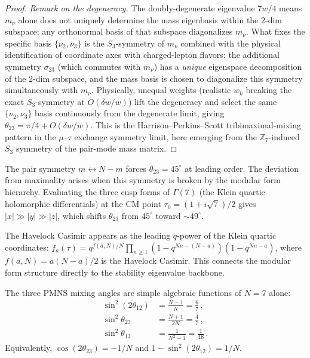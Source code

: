 \begin{proof}
\noindent
\emph{Remark on the degeneracy.}
The doubly-degenerate eigenvalue $7w/4$ means $m_\nu$
alone does not uniquely determine the mass eigenbasis
within the $2$-dim subspace; any orthonormal basis of that
subspace diagonalizes $m_\nu$.
What fixes the specific basis $\{\nu_2, \nu_3\}$ is the
$S_3$-symmetry of $m_\nu$ combined with the physical
identification of coordinate axes with charged-lepton
flavors: the additional symmetry $\sigma_{23}$ (which
commutes with $m_\nu$) has a \emph{unique} eigenspace
decomposition of the $2$-dim subspace, and the mass basis
is chosen to diagonalize this symmetry simultaneously
with $m_\nu$.
Physically, unequal weights (realistic $w_k$ breaking the
exact $S_3$-symmetry at $O(\delta w/w)$) lift the degeneracy
and select the same $\{\nu_2, \nu_3\}$ basis continuously from
the degenerate limit, giving $\theta_{23} = \pi/4 + O(\delta w/w)$.
This is the Harrison--Perkins--Scott tribimaximal-mixing
pattern in the $\mu$--$\tau$ exchange symmetry limit,
here emerging from the $\mathbb{Z}_7$-induced $S_3$ symmetry
of the pair-mode mass matrix.
\end{proof}

The pair symmetry $m \leftrightarrow N{-}m$ forces $\theta_{23} = 45^\circ$
at leading order.
The deviation from maximality arises when this symmetry
is broken by the modular form hierarchy.
Evaluating the three cusp forms of $\Gamma(7)$ (the Klein quartic
holomorphic differentials) at the CM point
$\tau_0 = (1{+}i\sqrt{7})/2$ gives
$|x| \gg |y| \gg |z|$, which shifts $\theta_{23}$
from $45^\circ$ toward $\sim\!49^\circ$.

The Havelock Casimir appears as the leading $q$-power of the
Klein quartic coordinates:
$f_a(\tau) = q^{f(a,N)/N}\prod_{n \ge 1}
(1{-}q^{Nn-(N-a)})(1{-}q^{Nn-a})$,
where $f(a,N) = a(N{-}a)/2$ is the Havelock Casimir.
This connects the modular form structure directly to the
stability eigenvalue backbone.

\begin{conjecture}
\label{conj:pmns}
The three PMNS mixing angles are simple algebraic functions of
$N = 7$ alone:
\begin{align}
\sin^2(2\theta_{12}) &= \tfrac{N{-}1}{N} = \tfrac{6}{7}\,,
\label{eq:pmns-solar}\\
\sin^2\theta_{23} &= \tfrac{N{+}1}{2N} = \tfrac{4}{7}\,,
\label{eq:pmns-atm}\\
\sin^2\theta_{13} &= \tfrac{1}{N^2{-}1} = \tfrac{1}{48}\,.
\label{eq:pmns-reactor}
\end{align}
Equivalently, $\cos(2\theta_{23}) = -1/N$ and
$1 - \sin^2(2\theta_{12}) = 1/N$.
\end{conjecture}

